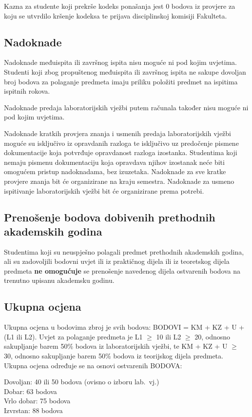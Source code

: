 \documentclass[times, 12pt, utf8]{book}
\newenvironment{myindentpar}[1]%
{\begin{list}{}%
         {\setlength{\leftmargin}{#1}}%
         \item[]%
}
{\end{list}}
\begin{document}
Kazna za studente koji prekrše kodeks ponašanja jest 0 bodova iz provjere za koju se utvrdilo kršenje kodeksa te prijava disciplinskoj komisiji Fakulteta.

\cleardoublepage  
{}  
{}
\subsection*{Nadoknade}

Nadoknade međuispita ili završnog ispita nisu moguće ni pod kojim uvjetima.
Studenti koji zbog propuštenog međuispita ili završnog ispita ne sakupe dovoljan broj bodova za polaganje predmeta imaju priliku položiti predmet na ispitima ispitnih rokova.

Nadoknade predaja laboratorijskih vježbi putem računala također nisu moguće ni pod kojim uvjetima.

Nadoknade kratkih provjera znanja i usmenih predaja laboratorijskih vježbi moguće su isključivo iz opravdanih razloga te isključivo uz predočenje pismene dokumentacije koja potvrđuje opravdanost razloga izostanka.
Studentima koji nemaju pismenu dokumentaciju koja opravdava njihov izostanak neće biti omogućem pristup nadoknadama, bez izuzetaka.
Nadoknade za sve kratke provjere znanja bit će organizirane na kraju semestra.
Nadoknade za usmeno ispitivanje laboratorijskih vježbi bit će organizirane prema potrebi.

\cleardoublepage  
{}  
{}
\subsection*{Prenošenje bodova dobivenih prethodnih akademskih godina}

Studentima koji su neuspješno polagali predmet prethodnih akademskih godina, ali su zadovoljili bodovni uvjet ili iz praktičnog dijela ili iz teoretskog dijela predmeta \textbf{ne omogućuje} se prenošenje navedenog dijela ostvarenih bodova na trenutno upisanu akademsku godinu.

\cleardoublepage  
{}  
{}
\subsection*{Ukupna ocjena}

Ukupna ocjena u bodovima zbroj je svih bodova: BODOVI = KM + KZ + U + (L1 ili L2).
Uvjet za polaganje predmeta je L1 $\geq$ 10 ili L2 $\geq$ 20, odnosno sakupljanje barem 50\% bodova iz laboratorijskih vježbi, te KM + KZ + U $\geq$ 30, odnosno sakupljanje barem 50\% bodova iz teorijskog dijela predmeta. \\
Ukupna ocjena određuje se na osnovi ostvarenih BODOVA:
\begin{myindentpar}{30pt}
Dovoljan: 40 ili 50 bodova (ovisno o izboru lab.~vj.) \\
Dobar: 63 bodova \\
Vrlo dobar: 75 bodova \\
Izvrstan: 88 bodova 
\end{myindentpar}
\end{document}
